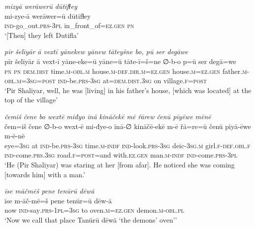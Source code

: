 \ea \label{ZP.64}
\textit{mizyā werāwerū dūtifɫey} \\ 
\gll mi-zye-ā werāwer=ū dūtifɫey \\ 
 \textsc{ind-}go\_out\textsc{.prs}\textsc{-3pl} in\_front\_of\textsc{\textsc{=ez.gen}} \textsc{pn} \\ 
\glt `[Then] they left Dutifla'
\z 
 
\ea \label{ZP.65}
\textit{pīr šelīyār ā vextī yānekew yānew tāteyšne bo, pū ser degāwe} \\ 
\gll pīr šelīyār ā vext-ī yāne-eke=ū yāne=ū tāte-ī=š=ne ∅-b-o p=ū ser degā=we \\ 
 \textsc{pn} \textsc{pn} \textsc{dem.dist} time\textsc{.m}\textsc{-obl}\textsc{.m} house\textsc{.m}\textsc{-def}\textsc{.dir}\textsc{.m}\textsc{\textsc{=ez.gen}} house\textsc{.m}\textsc{\textsc{=ez.gen}} father\textsc{.m}\textsc{-obl}\textsc{.m}\textsc{=3sg}\textsc{=\textsc{post}} \textsc{ind-}be\textsc{.prs}\textsc{-3sg} at=\textsc{dem.dist}\textsc{.3sg} on village\textsc{.f}\textsc{=\textsc{post}} \\ 
\glt `Pir Shaliyar, well, he was [living] in his father’s house, [which was located] at the top of the village'
\z 
 
\ea \label{ZP.66}
\textit{čemiš čene bo wextē miđyo īnā kināčekē mē řārew čenū pīyēwe mēnē} \\ 
\gll čem=iš čene ∅-b-o wext-ē mi-đye-o īnā-∅ kināčē-ekē m-ē řā=re=ū čenū pīyā-ēwe m-ē-nē \\ 
 eye\textsc{=3sg} at \textsc{ind-}be\textsc{.prs}\textsc{-3sg} time\textsc{.m}\textsc{-indf} \textsc{ind-}look\textsc{.prs}\textsc{-3sg} deic\textsc{-3sg}\textsc{.m} girl\textsc{.f}\textsc{-def}\textsc{.obl}\textsc{.f} \textsc{ind-}come\textsc{.prs}\textsc{.3sg} road\textsc{.f}\textsc{=\textsc{post}}=and with\textsc{.ez.gen} man\textsc{.m}\textsc{-indf} \textsc{ind-}come\textsc{.prs}\textsc{-3pl} \\ 
\glt `He (Pir Shaliyar) was staring at her [from afar]. He noticed she was coming [towards him] with a man.'
\z 
 
\ea \label{ZP.73}
\textit{īse māčmēš pene tenūrū dēwā} \\ 
\gll īse m-āč-mē=š pene tenūr=ū dēw-ā \\ 
 now \textsc{ind-}say\textsc{.prs}\textsc{-1pl}\textsc{=3sg} to oven\textsc{.m}\textsc{\textsc{=ez.gen}} demon\textsc{.m}\textsc{-obl}\textsc{.pl} \\ 
\glt `Now we call that place Tanūrū dēwā ‘the demons’ oven’'
\z 
 

